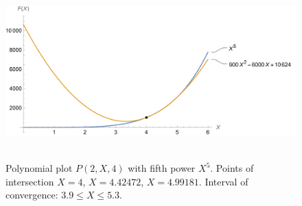 ﻿\begin{figure}[H]
    \centering
    \includegraphics[width=1\textwidth]{sections/images/03_plots_polynomial_p2_n4_with_fifth}
    ~\caption{Polynomial plot $P(2, X, 4)$ with fifth power $X^5$.
    Points of intersection $X=4$, $X=4.42472$, $X=4.99181$.
    Interval of convergence: $3.9 \leq X \leq 5.3$.
    }\label{fig:figure9}
\end{figure}

